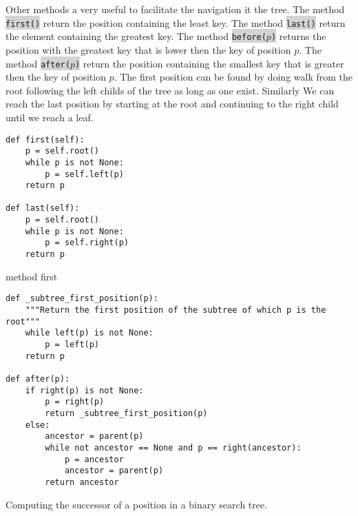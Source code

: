 \documentclass[10pt]{article}
\newcommand{\code}[1]{{\small\colorbox{LightGray}{\texttt{#1}}}}
\begin{document}
Other methods a very useful to facilitate the navigation it the tree. The method \code{first()} return the position containing the least key. The method \code{last()} return the element containing the greatest key. The method \code{before($p$)} returns the position with the greatest key that is lower then the key of position $p$. The method \code{after($p$)} return the position containing the smallest key that is greater then the key of position $p$. The first position can be found by doing  walk from the root following the left childs of the tree as long as one exist. Similarly We can reach the last position by starting at the root and continuing to  the right child until we reach a leaf.\\
\begin{listing}[ht]
\begin{verbatim}
def first(self):
    p = self.root()
    while p is not None:
        p = self.left(p)
    return p
    
def last(self):
    p = self.root()
    while p is not None:
        p = self.right(p)
    return p
\end{verbatim}
	\caption{method first}
	\label{listing:Tree.first}
\end{listing}
\begin{listing}[ht]
\begin{verbatim}
def _subtree_first_position(p):
    """Return the first position of the subtree of which p is the root"""
    while left(p) is not None:
        p = left(p)
    return p
	
def after(p):
	if right(p) is not None:
	    p = right(p)
	    return _subtree_first_position(p)
	else:
	    ancestor = parent(p)
	    while not ancestor == None and p == right(ancestor):
	        p = ancestor
	        ancestor = parent(p)
	    return ancestor
\end{verbatim}
\caption{Computing the successor of a position in a binary search tree.}
\label{listing:after}
\end{listing}
\end{document}

